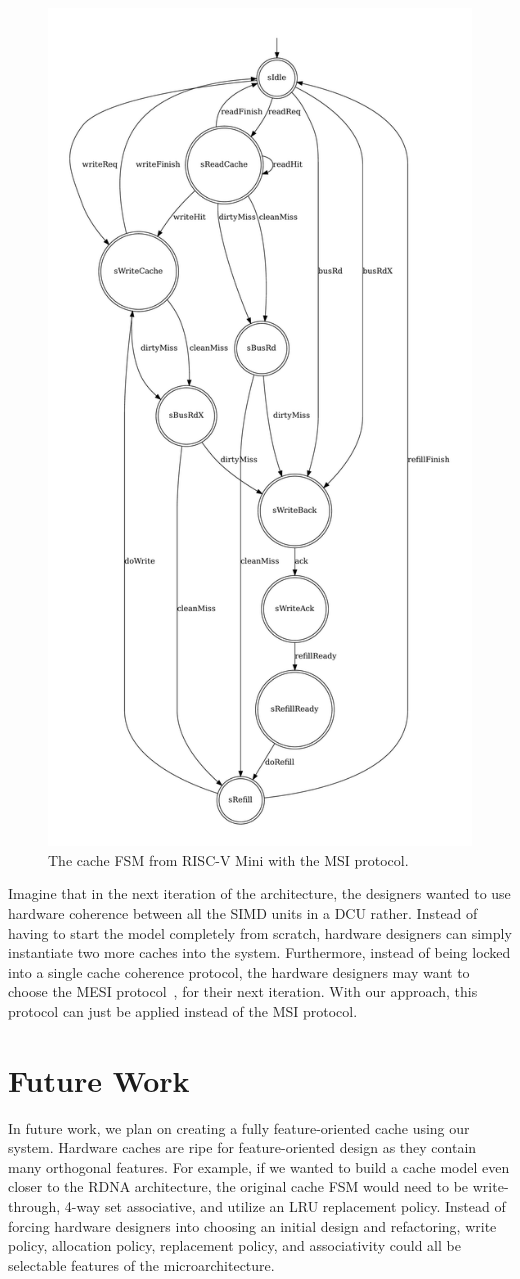 \documentclass[sigplan,anonymous,review]{acmart}
\begin{document}
\begin{figure}
    \centering
    \includegraphics[width=0.7\linewidth]{figures/cacheFSM2.pdf}
    \caption{The cache FSM from RISC-V Mini with the MSI protocol.}
    \label{fig:cacheAfter}
\end{figure}

Imagine that in the next iteration of the architecture, the designers wanted to use hardware coherence between all the SIMD units in a DCU rather. Instead of having to start the model completely from scratch, hardware designers can simply instantiate two more caches into the system. Furthermore, instead of being locked into a single cache coherence protocol, the hardware designers may want to choose the MESI protocol~\cite{}, for their next iteration. With our approach, this protocol can just be applied instead of the MSI protocol. 

\section{Future Work}
In future work, we plan on creating a fully feature-oriented cache using our system. Hardware caches are ripe for feature-oriented design as they contain many orthogonal features. For example, if we wanted to build a cache model even closer to the RDNA architecture, the original cache FSM would need to be write-through, 4-way set associative, and utilize an LRU replacement policy. Instead of forcing hardware designers into choosing an initial design and refactoring, write policy, allocation policy, replacement policy, and associativity could all be selectable features of the microarchitecture.
\end{document}

